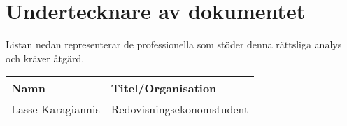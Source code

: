 \section{Undertecknare av dokumentet}
Listan nedan representerar de professionella som stöder denna rättsliga analys och kräver åtgärd.

\vspace{1cm}
\begin{tabular}{@{}p{}p{}@{}}
\textbf{Namn} & \textbf{Titel/Organisation} \\ \midrule
Lasse Karagiannis & Redovisningsekonomstudent \\

\end{tabular}

\vfill

